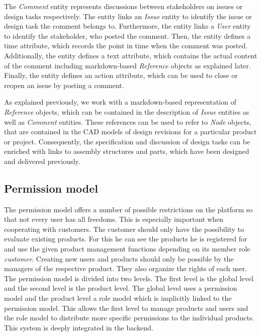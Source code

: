     The \textit{Comment} entity represents discussions between stakeholders on issues or design tasks respectively.
    The entity links an \textit{Issue} entity to identify the issue or design task the comment belongs to.
    Furthermore, the entity links a \textit{User} entity to identify the stakeholder, who posted the comment.
    Then, the entity defines a time attribute, which records the point in time when the comment was posted.
    Additionally, the entity defines a text attribute, which contains the actual content of the comment including markdown-based \textit{Reference} objects as explained later.
    Finally, the entity defines an action attribute, which can be used to close or reopen an issue by posting a comment.

    As explained previously, we work with a markdown-based representation of \textit{Reference} objects, which can be contained in the description of \textit{Issue} entities as well as \textit{Comment} entities.
    These references can be used to refer to \textit{Node} objects, that are contained in the CAD models of design revisions for a particular product or project.
    Consequently, the specification and discussion of design tasks can be enriched with links to assembly structures and parts, which have been designed and delivered previously.

    \subsection*{Permission model}
    \label{subsec:permissionModel}
    The permission model offers a number of possible restrictions on the platform so that not every user has all freedoms. This is especially important when cooperating with customers. The customer should only have the possibility to evaluate existing products. For this he can see the products he is registered for and use the given product management functions depending on its member role \textit{customer}. Creating new users and products should only be possible by the managers of the respective product. They also organize the rights of each user. The permission model is divided into two levels. The first level is the global level and the second level is the product level. The global level uses a permission model and the product level a role model which is implicitly linked to the permission model. 
    This allows the first level to manage products and users and the role model to distribute more specific permissions to the individual products. This system is deeply integrated in the backend.

